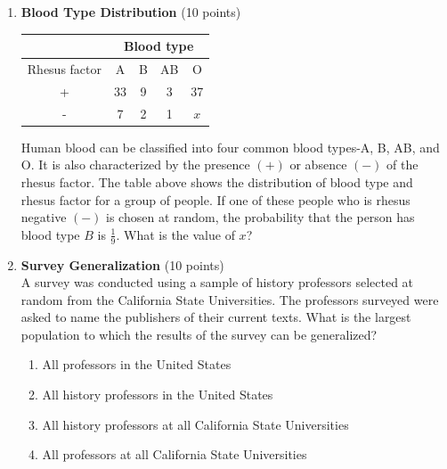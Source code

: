 \begin{enumerate}
  \newpage

  \item \textbf{Blood Type Distribution} (10 points)\\
  \begin{center}
  \begin{tabular}{|c|c|c|c|c|}
  \hline
  & \multicolumn{4}{|c|}{Blood type} \\
  \hline
  Rhesus factor & A & B & AB & O \\
  \hline
  + & 33 & 9 & 3 & 37 \\
  \hline
  - & 7 & 2 & 1 & $x$ \\
  \hline
  \end{tabular}
  \end{center}

  Human blood can be classified into four common blood types-A, B, AB, and O. It is also characterized by the presence $(+)$ or absence $(-)$ of the rhesus factor. The table above shows the distribution of blood type and rhesus factor for a group of people. If one of these people who is rhesus negative $(-)$ is chosen at random, the probability that the person has blood type $B$ is $\frac{1}{9}$. What is the value of $x$?
  \begin{subanswer}
  \end{subanswer}

  \item \textbf{Survey Generalization} (10 points)\\
  A survey was conducted using a sample of history professors selected at random from the California State Universities. The professors surveyed were asked to name the publishers of their current texts. What is the largest population to which the results of the survey can be generalized?
  \begin{enumerate}[label=(\Alph*)]
    \item All professors in the United States
    \item All history professors in the United States
    \item All history professors at all California State Universities
    \item All professors at all California State Universities
  \end{enumerate}
  \begin{subanswer}
  \end{subanswer}


\end{enumerate}
